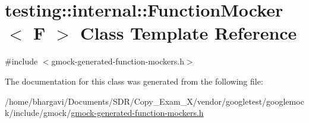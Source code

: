 \hypertarget{classtesting_1_1internal_1_1_function_mocker}{}\section{testing\+:\+:internal\+:\+:Function\+Mocker$<$ F $>$ Class Template Reference}
\label{classtesting_1_1internal_1_1_function_mocker}


{\ttfamily \#include $<$gmock-\/generated-\/function-\/mockers.\+h$>$}



The documentation for this class was generated from the following file\+:\begin{DoxyCompactItemize}
\item 
/home/bhargavi/\+Documents/\+S\+D\+R/\+Copy\+\_\+\+Exam\+\_\+X/vendor/googletest/googlemock/include/gmock/\hyperlink{gmock-generated-function-mockers_8h}{gmock-\/generated-\/function-\/mockers.\+h}\end{DoxyCompactItemize}
